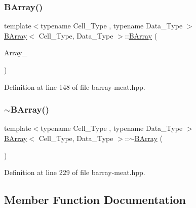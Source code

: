 \mbox{\label{class_b_array_ac003699092c4f91c5b292320ca769f85}} 
\subsubsection{\texorpdfstring{B\+Array()}{BArray()}\hspace{0.1cm}{\footnotesize\ttfamily [5/5]}}
{\footnotesize\ttfamily template$<$typename Cell\+\_\+\+Type , typename Data\+\_\+\+Type $>$ \\
\hyperlink{class_b_array}{B\+Array}$<$ Cell\+\_\+\+Type, Data\+\_\+\+Type $>$\+::\hyperlink{class_b_array}{B\+Array} (\begin{DoxyParamCaption}\item[{const \hyperlink{class_b_array}{B\+Array}$<$ Cell\+\_\+\+Type, Data\+\_\+\+Type $>$ \&}]{Array\+\_\+ }\end{DoxyParamCaption})\hspace{0.3cm}{\ttfamily [inline]}}



Definition at line 148 of file barray-\/meat.\+hpp.

\mbox{\label{class_b_array_af39acdf29aa5999a7f5fd48141be384e}} 
\subsubsection{\texorpdfstring{$\sim$\+B\+Array()}{~BArray()}}
{\footnotesize\ttfamily template$<$typename Cell\+\_\+\+Type , typename Data\+\_\+\+Type $>$ \\
\hyperlink{class_b_array}{B\+Array}$<$ Cell\+\_\+\+Type, Data\+\_\+\+Type $>$\+::$\sim$\hyperlink{class_b_array}{B\+Array} (\begin{DoxyParamCaption}{ }\end{DoxyParamCaption})\hspace{0.3cm}{\ttfamily [inline]}}



Definition at line 229 of file barray-\/meat.\+hpp.



\subsection{Member Function Documentation}
\mbox{\label{class_b_array_a6dd5ebff333b376c6fb569e48290935f}} 
